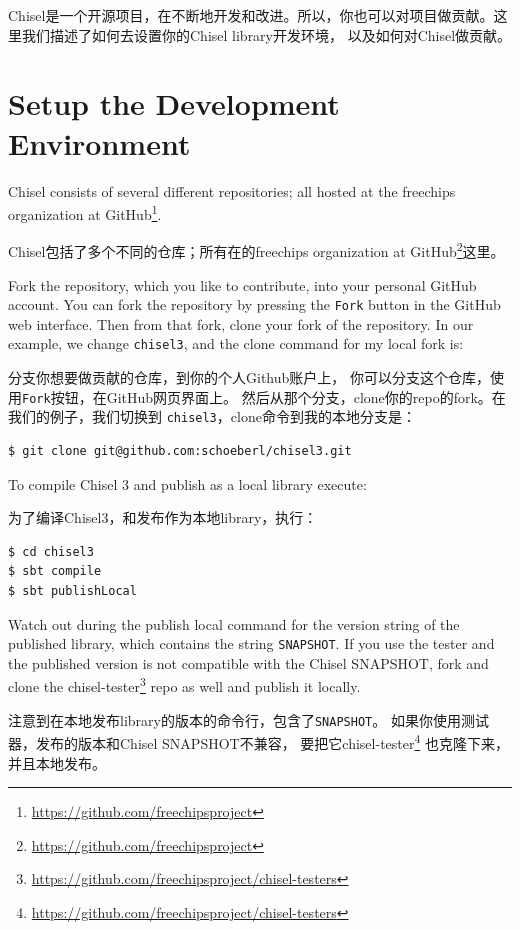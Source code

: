 \documentclass[%
    10pt,
    headinclude, footexclude,
    openright, %
    notitlepage,
    cleardoubleempty,
    headsepline,
    pointlessnumbers,
    bibtotoc, idxtotoc,
    ]{scrbook}
\newcommand{\code}[1]{{\small{\texttt{#1}}}}
\newcommand{\myref}[2]{\href{#1}{#2}}
\renewcommand{\myref}[2]{{#2}{\footnote{\url{#1}}}}
\begin{document}
Chisel是一个开源项目，在不断地开发和改进。所以，你也可以对项目做贡献。这里我们描述了如何去设置你的Chisel library开发环境，
以及如何对Chisel做贡献。

\section{Setup the Development Environment}

Chisel consists of several different repositories; all hosted at
the \myref{https://github.com/freechipsproject}{freechips organization at GitHub}.

Chisel包括了多个不同的仓库；所有在的\myref{https://github.com/freechipsproject}{freechips organization at GitHub}这里。

Fork the repository, which you like to contribute, into your personal GitHub account.
You can fork the repository by pressing the \code{Fork} button in the GitHub web interface.
Then from that fork, clone your fork of the repository. In our example, we change
\code{chisel3}, and the clone command for my local fork is:

分支你想要做贡献的仓库，到你的个人Github账户上，
你可以分支这个仓库，使用\code{Fork}按钮，在GitHub网页界面上。
然后从那个分支，clone你的repo的fork。在我们的例子，我们切换到
\code{chisel3}，clone命令到我的本地分支是：

\begin{verbatim}
$ git clone git@github.com:schoeberl/chisel3.git
\end{verbatim}

To compile Chisel 3 and publish as a local library execute:

为了编译Chisel3，和发布作为本地library，执行：

\begin{verbatim}
$ cd chisel3
$ sbt compile
$ sbt publishLocal
\end{verbatim}

Watch out during the publish local command for the version string of the published
library, which contains the string \code{SNAPSHOT}.
If you use the tester and the published version is not compatible with the Chisel
SNAPSHOT, fork and clone the \myref{https://github.com/freechipsproject/chisel-testers}{chisel-tester}
repo as well and publish it locally.

注意到在本地发布library的版本的命令行，包含了\code{SNAPSHOT}。
如果你使用测试器，发布的版本和Chisel SNAPSHOT不兼容，
要把它\myref{https://github.com/freechipsproject/chisel-testers}{chisel-tester}
也克隆下来，并且本地发布。
\end{document}
